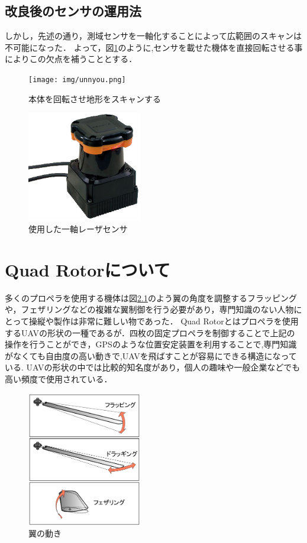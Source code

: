 \documentclass[12pt,oneside]{sotsuken_paper}
\begin{document}
\section{改良後のセンサの運用法}
しかし，先述の通り，測域センサを一軸化することによって広範囲のスキャンは不可能になった．
よって，図\ref{fig:unnyou}のように,センサを載せた機体を直接回転させる事によりこの欠点を補うこととする．

\begin{figure}[H]
\begin{center}
\texttt{[image: img/unnyou.png]}
\end{center}
\caption{本体を回転させ地形をスキャンする}
\label{fig:unnyou}
\end{figure}


\begin{figure}[H]
\begin{center}
\includegraphics[width=50mm]{img/2.png}
\end{center}
\caption{使用した一軸レーザセンサ}
\label{fig:2}
\end{figure}

\chapter{Quad Rotorについて}多くのプロペラを使用する機体は図\ref{fig:heri}のよう翼の角度を調整するフラッピングや，フェザリングなどの複雑な翼制御を行う必要があり，専門知識のない人物にとって操縦や製作は非常に難しい物であった\cite{sibata2003}．
Quad Rotorとはプロペラを使用するUAVの形状の一種であるが．四枚の固定プロペラを制御することで上記の操作を行うことができ，GPSのような位置安定装置を利用することで,専門知識がなくても自由度の高い動きで,UAVを飛ばすことが容易にできる構造になっている.
UAVの形状の中では比較的知名度があり，個人の趣味や一般企業などでも高い頻度で使用されている．

\begin{figure}[H]
\begin{center}
\includegraphics[width=50mm]{img/heri.png}
\end{center}
\caption{翼の動き}
\label{fig:heri}
\end{figure}
\end{document}
